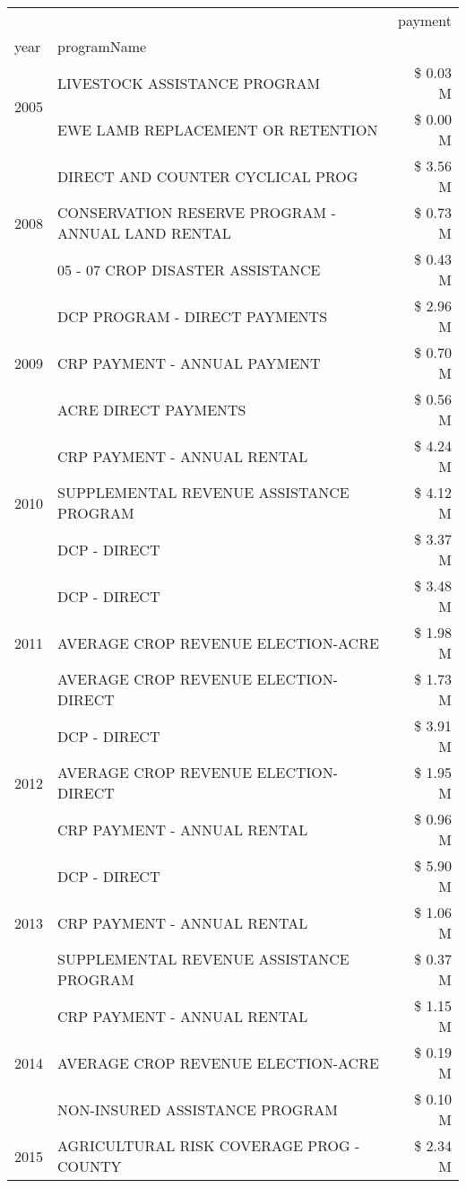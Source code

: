 \begin{tabular}{llr}
\toprule
 &  & payment \\
year & programName &  \\
\midrule
\multirow[t]{2}{*}{2005} & LIVESTOCK ASSISTANCE PROGRAM & \$ 0.03 M \\
 & EWE LAMB REPLACEMENT OR RETENTION & \$ 0.00 M \\
\cline{1-3}
\multirow[t]{3}{*}{2008} & DIRECT AND COUNTER CYCLICAL PROG & \$ 3.56 M \\
 & CONSERVATION RESERVE PROGRAM - ANNUAL LAND RENTAL & \$ 0.73 M \\
 & 05 - 07 CROP DISASTER ASSISTANCE & \$ 0.43 M \\
\cline{1-3}
\multirow[t]{3}{*}{2009} & DCP PROGRAM - DIRECT PAYMENTS & \$ 2.96 M \\
 & CRP PAYMENT - ANNUAL PAYMENT & \$ 0.70 M \\
 & ACRE DIRECT PAYMENTS & \$ 0.56 M \\
\cline{1-3}
\multirow[t]{3}{*}{2010} & CRP PAYMENT - ANNUAL RENTAL & \$ 4.24 M \\
 & SUPPLEMENTAL REVENUE ASSISTANCE PROGRAM & \$ 4.12 M \\
 & DCP - DIRECT & \$ 3.37 M \\
\cline{1-3}
\multirow[t]{3}{*}{2011} & DCP - DIRECT & \$ 3.48 M \\
 & AVERAGE CROP REVENUE ELECTION-ACRE & \$ 1.98 M \\
 & AVERAGE CROP REVENUE ELECTION-DIRECT & \$ 1.73 M \\
\cline{1-3}
\multirow[t]{3}{*}{2012} & DCP - DIRECT & \$ 3.91 M \\
 & AVERAGE CROP REVENUE ELECTION-DIRECT & \$ 1.95 M \\
 & CRP PAYMENT - ANNUAL RENTAL & \$ 0.96 M \\
\cline{1-3}
\multirow[t]{3}{*}{2013} & DCP - DIRECT & \$ 5.90 M \\
 & CRP PAYMENT - ANNUAL RENTAL & \$ 1.06 M \\
 & SUPPLEMENTAL REVENUE ASSISTANCE PROGRAM & \$ 0.37 M \\
\cline{1-3}
\multirow[t]{3}{*}{2014} & CRP PAYMENT - ANNUAL RENTAL & \$ 1.15 M \\
 & AVERAGE CROP REVENUE ELECTION-ACRE & \$ 0.19 M \\
 & NON-INSURED ASSISTANCE PROGRAM & \$ 0.10 M \\
\cline{1-3}
\multirow[t]{3}{*}{2015} & AGRICULTURAL RISK COVERAGE PROG - COUNTY & \$ 2.34 M \\

\end{tabular}
